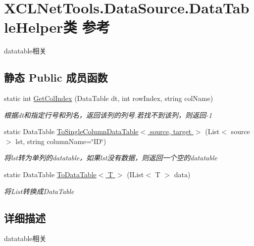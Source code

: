 \hypertarget{class_x_c_l_net_tools_1_1_data_source_1_1_data_table_helper}{}\section{X\+C\+L\+Net\+Tools.\+Data\+Source.\+Data\+Table\+Helper类 参考}
\label{class_x_c_l_net_tools_1_1_data_source_1_1_data_table_helper}


datatable相关  


\subsection*{静态 Public 成员函数}
\begin{DoxyCompactItemize}
\item 
static int \hyperlink{class_x_c_l_net_tools_1_1_data_source_1_1_data_table_helper_a511bf3d8ae5d373939b661f561cf5960}{Get\+Col\+Index} (Data\+Table dt, int row\+Index, string col\+Name)
\begin{DoxyCompactList}\small\item\em 根据dt和指定行号和列名，返回该列的列号.\+若找不到该列，则返回-\/1 \end{DoxyCompactList}\item 
static Data\+Table \hyperlink{class_x_c_l_net_tools_1_1_data_source_1_1_data_table_helper_a1857097ac0d5c70dc583967cfab013cd}{To\+Single\+Column\+Data\+Table$<$ source, target $>$} (List$<$ source $>$ lst, string column\+Name=\char`\"{}ID\char`\"{})
\begin{DoxyCompactList}\small\item\em 将lst转为单列的datatable，如果lst没有数据，则返回一个空的datatable \end{DoxyCompactList}\item 
static Data\+Table \hyperlink{class_x_c_l_net_tools_1_1_data_source_1_1_data_table_helper_a260f6bf6cc10a4de3e39c37c02533d9d}{To\+Data\+Table$<$ T $>$} (I\+List$<$ T $>$ data)
\begin{DoxyCompactList}\small\item\em 将\+List转换成\+Data\+Table \end{DoxyCompactList}\end{DoxyCompactItemize}


\subsection{详细描述}
datatable相关 



